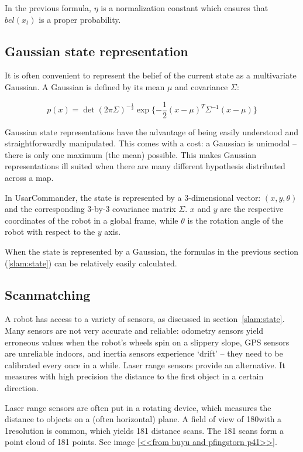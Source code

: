 In the previous formula, $\eta$ is a normalization constant which ensures that $bel(x_t)$ is a proper probability.

\subsection{Gaussian state representation}
It is often convenient to represent the belief of the current state as a multivariate Gaussian. A Gaussian is defined by its mean $\mu$ and covariance $\Sigma$:

\begin{equation}
p(x) = \det(2\pi\Sigma)^{-\frac{1}{2}}\exp{\{-\frac{1}{2}(x - \mu)^T\Sigma^{-1}(x - \mu)\}}
\end{equation}

Gaussian state representations have the advantage of being easily understood and straightforwardly manipulated. This comes with a cost: a Gaussian is unimodal -- there is only one maximum (the mean) possible. This makes Gaussian representations ill suited when there are many different hypothesis distributed across a map. 

In UsarCommander, the state is represented by a 3-dimensional vector: $(x, y, \theta)$ and the corresponding 3-by-3 covariance matrix $\Sigma$. $x$ and $y$ are the respective coordinates of the robot in a global frame, while $\theta$ is the rotation angle of the robot with respect to the $y$ axis.

When the state is represented by a Gaussian, the formulas in the previous section (\ref{slam:state}) can be relatively easily calculated.

\subsection{Scanmatching}
A robot has access to a variety of sensors, as discussed in section~\ref{slam:state}. Many sensors are not very accurate and reliable: odometry sensors yield erroneous values when the robot's wheels spin on a slippery slope, GPS sensors are unreliable indoors, and inertia sensors experience `drift' -- they need to be calibrated every once in a while. Laser range sensors provide an alternative. It measures with high precision the distance to the first object in a certain direction. 

Laser range sensors are often put in a rotating device, which measures the distance to objects on a (often horizontal) plane. A field of view of 180\degree with a 1\degree resolution is common, which yields 181 distance scans. The 181 scans form a point cloud of 181 points. See image \ref{<<from buyu and pfingstorn p41>>}. 

